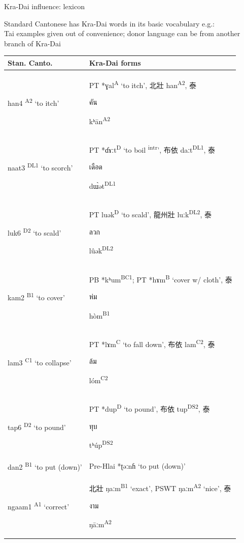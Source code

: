 \documentclass{beamer}
\begin{document}
\begin{frame}[fragile]{Kra-Dai influence: lexicon}

{\small Standard Cantonese has Kra-Dai words in its basic vocabulary e.g.:}\\
{\tiny Tai examples given out of convenience; donor language can be from another branch of Kra-Dai}\\
\medskip
{\footnotesize
\begin{tabular}{l|l}
     Stan. Canto. & Kra-Dai forms\\ \hline
     han4 \textsuperscript{A2} \enquote*{to itch} & PT *ɣal\textsuperscript{A} \enquote*{to itch}, 北壯 han\textsuperscript{A2}, 泰 \begin{thai}คัน\end{thai} kʰān\textsuperscript{A2}\\
     naat3 \textsuperscript{DL1} \enquote*{to scorch} & PT *ɗɤːt\textsuperscript{D} \enquote*{to boil \textsuperscript{intr}}, 布依 daːt\textsuperscript{DL1}, 泰 \begin{thai}เดือด\end{thai} dɯ̀ət\textsuperscript{DL1}\\
     luk6 \textsuperscript{D2} \enquote*{to scald} & PT luək\textsuperscript{D} \enquote*{to scald}, 龍州壯 luːk\textsuperscript{DL2}, 泰 \begin{thai}ลวก\end{thai} lûək\textsuperscript{DL2}\\
     kam2 \textsuperscript{B1} \enquote*{to cover} & PB *kʰum\textsuperscript{BC1}; PT *hɤm\textsuperscript{B} \enquote*{cover w/ cloth}, 泰 \begin{thai}ห่ม\end{thai} hòm\textsuperscript{B1}\\
     lam3 \textsuperscript{C1} \enquote*{to collapse} & PT *lɤm\textsuperscript{C} \enquote*{to fall down}, 布依 lam\textsuperscript{C2}, 泰 \begin{thai}ล้ม\end{thai} lóm\textsuperscript{C2}\\
     tap6 \textsuperscript{D2} \enquote*{to pound} & PT *dup\textsuperscript{D} \enquote*{to pound}, 布依 tup\textsuperscript{DS2}, 泰 \begin{thai}ทุบ\end{thai} tʰúp\textsuperscript{DS2}\\
     dan2 \textsuperscript{B1} \enquote*{to put (down)} & Pre-Hlai *ʈəːnɦ \enquote*{to put (down)}\\
     ngaam1 \textsuperscript{A1} \enquote*{correct} & 北壯 ŋaːm\textsuperscript{B1} \enquote*{exact}, PSWT ŋaːm\textsuperscript{A2} \enquote*{nice}, 泰 \begin{thai}งาม\end{thai} ŋāːm\textsuperscript{A2}\\ 

\end{tabular}}
\end{frame}
\end{document}
